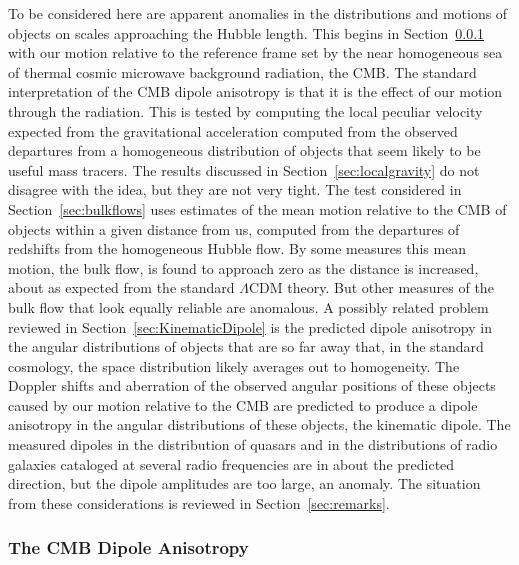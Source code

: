 \documentclass[fleqn,usenatbib]{mnras}
\begin{document}
To be considered here are apparent anomalies in the distributions and motions of objects on scales approaching the Hubble length. This begins in Section~\ref{sec:CMBDipole} with our motion relative to the reference frame set by the near homogeneous sea of thermal cosmic microwave background radiation, the CMB. The standard interpretation of the CMB dipole anisotropy is that it is the effect of our motion through the radiation. This is tested by computing the local peculiar velocity expected from the gravitational acceleration computed from the observed departures from a homogeneous distribution of objects that seem likely to be useful mass tracers. The results discussed in Section~\ref{sec:localgravity} do not disagree with the idea, but they are not very tight. The test considered in Section~\ref{sec:bulkflows} uses estimates of the mean motion relative to the CMB of objects within a given distance from us, computed from the departures of redshifts from the homogeneous Hubble flow. By some measures this mean motion, the bulk flow, is found to approach zero as the distance is increased, about as expected from the standard $\Lambda$CDM theory. But other measures of the bulk flow that look equally reliable are anomalous. A possibly related problem reviewed in Section~\ref{sec:KinematicDipole} is the predicted dipole anisotropy in the angular distributions of objects that are so far away that, in the standard cosmology, the space distribution likely averages out to homogeneity. The Doppler shifts and aberration of the observed angular positions of these objects caused by our motion relative to the CMB are predicted to produce a dipole anisotropy in the angular distributions of these objects, the kinematic dipole. The measured dipoles in the distribution of quasars and in the distributions of radio galaxies cataloged at several radio frequencies are in about the predicted direction, but the dipole amplitudes are too large, an anomaly. The situation from these considerations is reviewed in Section~\ref{sec:remarks}.

\subsubsection{The CMB Dipole Anisotropy}\label{sec:CMBDipole}
\end{document}
